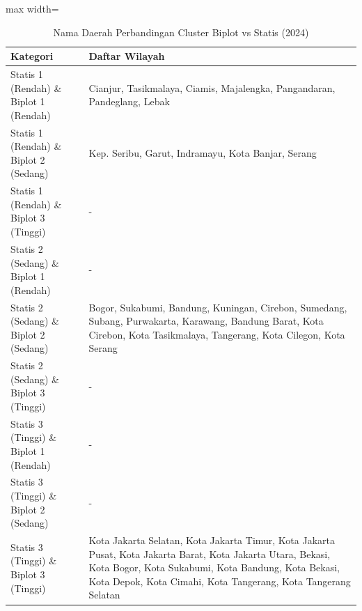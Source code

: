 \begin{table}[H]
\centering
\caption{Nama Daerah Perbandingan Cluster Biplot vs Statis (2024)} \label{tab:appbiplot_statis_name_2024}
\begin{adjustbox}{max width=\textwidth}
\begin{tabular}{|p{4cm}|p{10cm}|}
\hline
\textbf{Kategori} & \textbf{Daftar Wilayah} \\
\hline
Statis 1 (Rendah) \& Biplot 1 (Rendah) & Cianjur, Tasikmalaya, Ciamis, Majalengka, Pangandaran, Pandeglang, Lebak \\
\hline
Statis 1 (Rendah) \& Biplot 2 (Sedang) & Kep. Seribu, Garut, Indramayu, Kota Banjar, Serang \\
\hline
Statis 1 (Rendah) \& Biplot 3 (Tinggi) & - \\
\hline
Statis 2 (Sedang) \& Biplot 1 (Rendah) & - \\
\hline
Statis 2 (Sedang) \& Biplot 2 (Sedang) & Bogor, Sukabumi, Bandung, Kuningan, Cirebon, Sumedang, Subang, Purwakarta, Karawang, Bandung Barat, Kota Cirebon, Kota Tasikmalaya, Tangerang, Kota Cilegon, Kota Serang \\
\hline
Statis 2 (Sedang) \& Biplot 3 (Tinggi) & - \\
\hline
Statis 3 (Tinggi) \& Biplot 1 (Rendah) & - \\
\hline
Statis 3 (Tinggi) \& Biplot 2 (Sedang) & - \\
\hline
Statis 3 (Tinggi) \& Biplot 3 (Tinggi) & Kota Jakarta Selatan, Kota Jakarta Timur, Kota Jakarta Pusat, Kota Jakarta Barat, Kota Jakarta Utara, Bekasi, Kota Bogor, Kota Sukabumi, Kota Bandung, Kota Bekasi, Kota Depok, Kota Cimahi, Kota Tangerang, Kota Tangerang Selatan \\
\hline
\end{tabular}
\end{adjustbox}
\end{table}